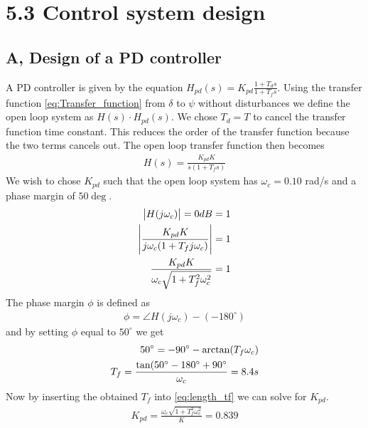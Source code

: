 \section{5.3 Control system design}
\subsection{A, Design of a PD controller}
A PD controller is given by the equation $H_{pd}(s) = K_{pd} \frac{1+T_ds}{1+T_fs}$. Using the transfer function \cref{eq:Transfer_function} from $\delta$ to $\psi$ without disturbances we define the open loop system as $H(s) \cdot H_{pd}(s)$. We chose $T_d=T$ to cancel the transfer function time constant. This reduces the order of the transfer function because the two terms cancels out. The open loop transfer function then becomes
\begin{align} \label{eq:transfer_function_open_loop}
    H(s) = \frac{K_{pd}K}{s(1+T_f s)}
\end{align} 
We wish to chose $K_{pd}$ such that the open loop system has $\omega_c = 0.10$ rad/s and a phase margin of $50 \deg$. 
\begin{align}
    \left| H(j\omega_c) \right| = 0 dB = 1 \notag \\
    \left| \frac{K_{pd}K}{j\omega_c(1+T_f j\omega_c)}\right| = 1 \notag \\
    \frac{K_{pd}K}{\omega_c \sqrt{1+T_f^2\omega_c^2}} = 1 \label{eq:length_tf}
\end{align}
The phase margin $\phi$ is defined as 
\begin{align}
    \phi = \angle H(j\omega_c) - (-180^\circ)
\end{align}
and by setting $\phi$ equal to $50^\circ$ we get
\begin{align}
    50^\circ = -90^\circ - \textrm{arctan}(T_f \omega_c)\notag \\
    T_f = \frac{\textrm{tan}(50^\circ-180^\circ+90^\circ}{\omega_c} = 8.4s
\end{align}
Now by inserting the obtained $T_f$ into \cref{eq:length_tf} we can solve for $K_{pd}$.
\begin{align}
    K_{pd} = \frac{\omega_c \sqrt{1+T_f^2\omega_c^2}}{K} = 0.839
\end{align}

